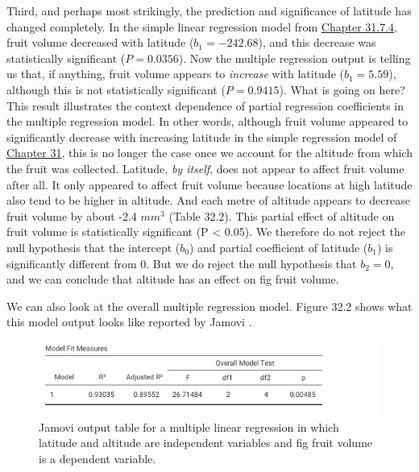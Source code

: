 \documentclass[
]{scrbook}
\begin{document}
Third, and perhaps most strikingly, the prediction and significance of latitude has changed completely.
In the simple linear regression model from \protect\hyperlink{simple-regression-output}{Chapter 31.7.4}, fruit volume decreased with latitude (\(b_{1} = -242.68\)), and this decrease was statistically significant (\(P = 0.0356\)).
Now the multiple regression output is telling us that, if anything, fruit volume appears to \emph{increase} with latitude (\(b_{1} = 5.59\)), although this is not statistically significant (\(P = 0.9415\)).
What is going on here?
This result illustrates the context dependence of partial regression coefficients in the multiple regression model.
In other words, although fruit volume appeared to significantly decrease with increasing latitude in the simple regression model of \protect\hyperlink{Chapter_31}{Chapter 31}, this is no longer the case once we account for the altitude from which the fruit was collected.
Latitude, \emph{by itself}, does not appear to affect fruit volume after all.
It only appeared to affect fruit volume because locations at high latitude also tend to be higher in altitude.
And each metre of altitude appears to decrease fruit volume by about -2.4 \(mm^{3}\) (Table 32.2).
This partial effect of altitude on fruit volume is statistically significant (P \textless{} 0.05).
We therefore do not reject the null hypothesis that the intercept (\(b_{0}\)) and partial coefficient of latitude (\(b_{1}\)) is significantly different from 0.
But we do reject the null hypothesis that \(b_{2} = 0\), and we can conclude that altitude has an effect on fig fruit volume.

We can also look at the overall multiple regression model.
Figure 32.2 shows what this model output looks like reported by Jamovi \citep{Jamovi2022}.

\begin{figure}
\includegraphics[width=1\linewidth]{img/jamovi_overall_multiple_regression_output} \caption{Jamovi output table for a multiple linear regression in which latitude and altitude are independent variables and fig fruit volume is a dependent variable.}\label{fig:unnamed-chunk-173}
\end{figure}
\end{document}
